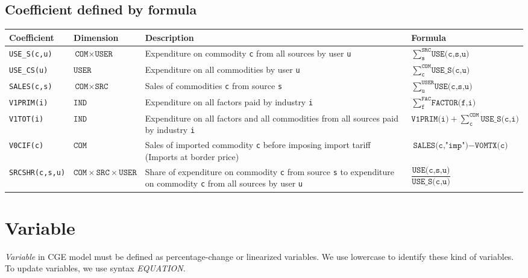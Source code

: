 \documentclass{article}
\begin{document}
\subsection{Coefficient defined by formula}
\begin{tabular}{llp{6.5cm}l}
    \toprule
    \textbf{Coefficient} & \textbf{Dimension} & \textbf{Description} &
    \textbf{Formula} \\
    \midrule
    \texttt{USE\_S(c,u)} & $\texttt{COM}\times\texttt{USER}$ & Expenditure on commodity \texttt{c} from all sources by user \texttt{u} & $\sum\limits_\texttt{s}^\texttt{SRC}\texttt{USE(c,s,u)}$ \\
    \texttt{USE\_CS(u)} & $\texttt{USER}$ & Expenditure on all commodities by user \texttt{u} & $\sum\limits_\texttt{c}^\texttt{COM}\texttt{USE\_S(c,u)}$ \\
    \texttt{SALES(c,s)} & $\texttt{COM}\times\texttt{SRC}$ & Sales of commodities \texttt{c} from source \texttt{s} & $\sum\limits_\texttt{u}^\texttt{USER}\texttt{USE(c,s,u)}$ \\
    \texttt{V1PRIM(i)} & $\texttt{IND}$ & Expenditure on all factors paid by industry \texttt{i} & $\sum\limits_\texttt{f}^\texttt{FAC}\texttt{FACTOR(f,i)}$ \\
    \texttt{V1TOT(i)} & $\texttt{IND}$ & Expenditure on all factors and all commodities from all sources paid by industry \texttt{i} & $\texttt{V1PRIM(i)} + \sum\limits_\texttt{c}^\texttt{COM}\texttt{USE\_S(c,i)}$ \\
    \texttt{V0CIF(c)} & $\texttt{COM}$ & Sales of imported commodity \texttt{c} before imposing import tariff (Imports at border price)  & $\texttt{SALES(c,"imp")}  - \texttt{V0MTX(c)}$ \\
    \texttt{SRCSHR(c,s,u)} & $\texttt{COM}\times\texttt{SRC}\times\texttt{USER}$ & Share of expenditure on commodity \texttt{c} from source \texttt{s} to expenditure on commodity \texttt{c} from all sources by user \texttt{u} & $\dfrac{\texttt{USE(c,s,u)}}{\texttt{USE\_S(c,u)}}$ \\
    \bottomrule
\end{tabular}

\section{Variable}
\textit{Variable} in CGE model must be defined as percentage-change or linearized variables. We use lowercase to identify these kind of variables. To update variables, we use syntax \textit{EQUATION}. 
\end{document}
